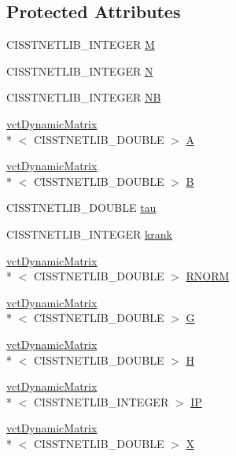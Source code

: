 \subsection*{Protected Attributes}
\begin{DoxyCompactItemize}
\item 
C\-I\-S\-S\-T\-N\-E\-T\-L\-I\-B\-\_\-\-I\-N\-T\-E\-G\-E\-R \hyperlink{classnmr_h_f_t_i_solver_a40cb06d09c71e3cc5ccb4801af493714}{M}
\item 
C\-I\-S\-S\-T\-N\-E\-T\-L\-I\-B\-\_\-\-I\-N\-T\-E\-G\-E\-R \hyperlink{classnmr_h_f_t_i_solver_aef47acf4465e3bbc224d29550ea68fed}{N}
\item 
C\-I\-S\-S\-T\-N\-E\-T\-L\-I\-B\-\_\-\-I\-N\-T\-E\-G\-E\-R \hyperlink{classnmr_h_f_t_i_solver_ab83977ce7dee82d78187122861d5492e}{N\-B}
\item 
\hyperlink{classvct_dynamic_matrix}{vct\-Dynamic\-Matrix}\\*
$<$ C\-I\-S\-S\-T\-N\-E\-T\-L\-I\-B\-\_\-\-D\-O\-U\-B\-L\-E $>$ \hyperlink{classnmr_h_f_t_i_solver_a3bf7da50e30b56b35fa988819596c883}{A}
\item 
\hyperlink{classvct_dynamic_matrix}{vct\-Dynamic\-Matrix}\\*
$<$ C\-I\-S\-S\-T\-N\-E\-T\-L\-I\-B\-\_\-\-D\-O\-U\-B\-L\-E $>$ \hyperlink{classnmr_h_f_t_i_solver_a208b4bacf42c9d2b336f40a84f1f24b4}{B}
\item 
C\-I\-S\-S\-T\-N\-E\-T\-L\-I\-B\-\_\-\-D\-O\-U\-B\-L\-E \hyperlink{classnmr_h_f_t_i_solver_ae2a7e0bc2500e3f05e2028b37b7666bc}{tau}
\item 
C\-I\-S\-S\-T\-N\-E\-T\-L\-I\-B\-\_\-\-I\-N\-T\-E\-G\-E\-R \hyperlink{classnmr_h_f_t_i_solver_ac7a0dd2e365ca0310b5bb988d7b0f5b2}{krank}
\item 
\hyperlink{classvct_dynamic_matrix}{vct\-Dynamic\-Matrix}\\*
$<$ C\-I\-S\-S\-T\-N\-E\-T\-L\-I\-B\-\_\-\-D\-O\-U\-B\-L\-E $>$ \hyperlink{classnmr_h_f_t_i_solver_a48c6c27d605fc52aca0b91a2f077e555}{R\-N\-O\-R\-M}
\item 
\hyperlink{classvct_dynamic_matrix}{vct\-Dynamic\-Matrix}\\*
$<$ C\-I\-S\-S\-T\-N\-E\-T\-L\-I\-B\-\_\-\-D\-O\-U\-B\-L\-E $>$ \hyperlink{classnmr_h_f_t_i_solver_a6b774e25595536c6c694d96dcef70587}{G}
\item 
\hyperlink{classvct_dynamic_matrix}{vct\-Dynamic\-Matrix}\\*
$<$ C\-I\-S\-S\-T\-N\-E\-T\-L\-I\-B\-\_\-\-D\-O\-U\-B\-L\-E $>$ \hyperlink{classnmr_h_f_t_i_solver_a501a8290546e44496608d9c0cca2a550}{H}
\item 
\hyperlink{classvct_dynamic_matrix}{vct\-Dynamic\-Matrix}\\*
$<$ C\-I\-S\-S\-T\-N\-E\-T\-L\-I\-B\-\_\-\-I\-N\-T\-E\-G\-E\-R $>$ \hyperlink{classnmr_h_f_t_i_solver_a42a92f5a8334b8974fb87d66abf24f99}{I\-P}
\item 
\hyperlink{classvct_dynamic_matrix}{vct\-Dynamic\-Matrix}\\*
$<$ C\-I\-S\-S\-T\-N\-E\-T\-L\-I\-B\-\_\-\-D\-O\-U\-B\-L\-E $>$ \hyperlink{classnmr_h_f_t_i_solver_a4e62d4f46bf8c16e79aef9063ce9a901}{X}
\end{DoxyCompactItemize}


